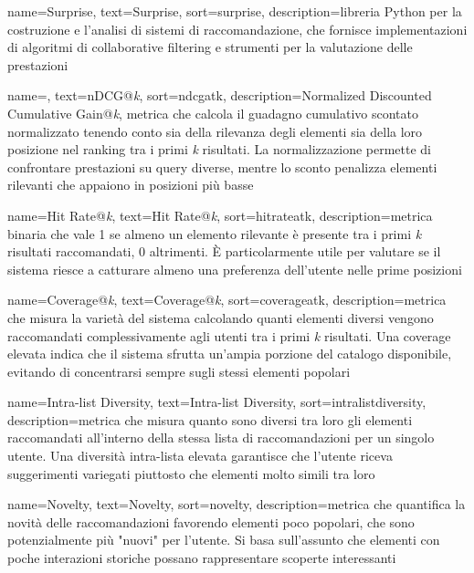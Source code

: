  {
    name=Surprise,
    text=Surprise,
    sort=surprise,
    description={libreria Python per la costruzione e l'analisi di sistemi di raccomandazione, che fornisce implementazioni di algoritmi di collaborative filtering e strumenti per la valutazione delle prestazioni}
}

 {
    name=,
    text=nDCG@\emph{k},
    sort=ndcgatk,
    description={Normalized Discounted Cumulative Gain@\emph{k}, metrica che calcola il guadagno cumulativo scontato normalizzato tenendo conto sia della rilevanza degli elementi sia della loro posizione nel ranking tra i primi \emph{k} risultati. La normalizzazione permette di confrontare prestazioni su query diverse, mentre lo sconto penalizza elementi rilevanti che appaiono in posizioni più basse}
}

 {
    name=Hit Rate@\emph{k},
    text=Hit Rate@\emph{k},
    sort=hitrateatk,
    description={metrica binaria che vale 1 se almeno un elemento rilevante è presente tra i primi \emph{k} risultati raccomandati, 0 altrimenti. È particolarmente utile per valutare se il sistema riesce a catturare almeno una preferenza dell'utente nelle prime posizioni}
}

 {
    name=Coverage@\emph{k},
    text=Coverage@\emph{k},
    sort=coverageatk,
    description={metrica che misura la varietà del sistema calcolando quanti elementi diversi vengono raccomandati complessivamente agli utenti tra i primi \emph{k} risultati. Una coverage elevata indica che il sistema sfrutta un'ampia porzione del catalogo disponibile, evitando di concentrarsi sempre sugli stessi elementi popolari}
}

 {
    name=Intra-list Diversity,
    text=Intra-list Diversity,
    sort=intralistdiversity,
    description={metrica che misura quanto sono diversi tra loro gli elementi raccomandati all'interno della stessa lista di raccomandazioni per un singolo utente. Una diversità intra-lista elevata garantisce che l'utente riceva suggerimenti variegati piuttosto che elementi molto simili tra loro}
}

 {
    name=Novelty,
    text=Novelty,
    sort=novelty,
    description={metrica che quantifica la novità delle raccomandazioni favorendo elementi poco popolari, che sono potenzialmente più "nuovi" per l'utente. Si basa sull'assunto che elementi con poche interazioni storiche possano rappresentare scoperte interessanti}
}

